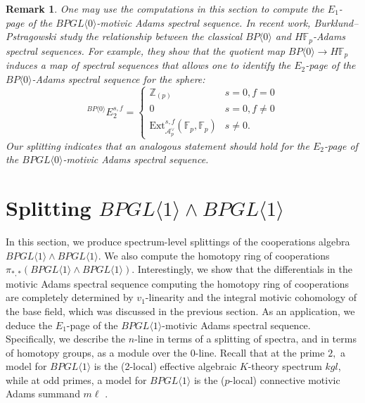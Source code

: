 \documentclass{amsart}
\newtheorem{remark}[theorem]{Remark}
\theoremstyle{plain}
\numberwithin{theorem}{section}
\numberwithin{equation}{section}
\numberwithin{figure}{section}
\newcommand{\0}{\langle 0 \rangle }
\begin{document}
\begin{remark}
    \rm One may use the computations in this section to compute the $E_1$-page of the $BPGL \langle 0 \rangle$-motivic Adams spectral sequence. In recent work, Burklund--Pstragowski \cite{BurPst25} study the relationship between the classical $BP \langle 0\rangle$ and $H\mathbb{F}_p$-Adams spectral sequences. For example, they show that the quotient map $BP \langle 0 \rangle \to H\mathbb{F}_p$ induces a map of spectral sequences that allows one to identify the $E_2$-page of the $BP \langle 0 \rangle$-Adams spectral sequence for the sphere:
    \[
    ^{BP \langle 0 \rangle}E_2^{s,f} = \left\{\begin{array}{rl}
        \mathbb{Z}_{(p)} &  s=0,f=0\\
        0 & s=0, f \neq 0\\
        \text{Ext}_{\mathcal{A}^\vee_p}^{s,f}(\mathbb{F}_p, \mathbb{F}_p) & s \neq 0.
    \end{array} \right.
    \]
    Our splitting indicates that an analogous statement should hold for the $E_2$-page of the $BPGL \langle 0 \rangle$-motivic Adams spectral sequence. 
    
\end{remark}


\section{Splitting $BPGL\langle 1 \rangle\wedge BPGL \langle 1 \rangle$}
\label{sec:BPGL1}
In this section, we produce spectrum-level splittings of the cooperations algebra $BPGL \langle 1 \rangle \wedge BPGL \langle 1 \rangle$. We also compute the homotopy ring of cooperations $\pi_{*,*}(BPGL \langle 1 \rangle \wedge BPGL \langle 1 \rangle)$. Interestingly, we show that the differentials in the motivic Adams spectral sequence computing the homotopy ring of cooperations are completely determined by $v_1$-linearity and the integral motivic cohomology of the base field, which was discussed in the previous section. As an application, we deduce the $E_1$-page of the $BPGL\langle 1 \rangle$-motivic Adams spectral sequence. Specifically, we describe the $n$-line in terms of a splitting of spectra, and in terms of homotopy groups, as a module over the 0-line. Recall that at the prime $2,$ a model for $BPGL \langle 1 \rangle$ is the (2-local) effective algebraic $K$-theory spectrum $kgl$, while at odd primes, a model for $BPGL \langle 1 \rangle$ is the ($p$-local) connective motivic Adams summand $m\ell$ \cite{NauSpiOst15}.
\end{document}

